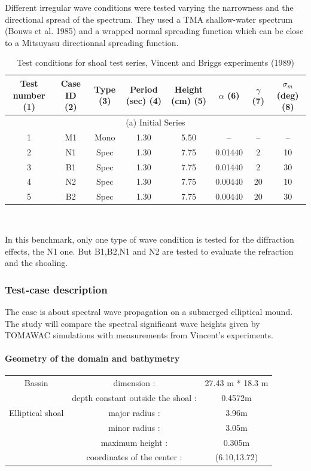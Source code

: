 Different irregular wave conditions were tested varying the narrowness and the directional spread of the spectrum. They used a TMA shallow-water spectrum (Bouws et al. 1985) and a wrapped normal spreading function which can be close to a Mitsuyasu directionnal spreading function.\\
\begin{table}

\begin{tabular}{|c|c|c|c|c|c|c|c|}
\hline
\hline
Test number (1) & Case ID (2) & Type (3) & Period (sec) (4) & Height (cm) (5) & $\alpha$ (6) & $\gamma$ (7) & $\sigma _m$ (deg) (8) \\
\hline
\multicolumn{8}{|c|}{(a) Initial Series}\\
\hline
1 & M1 & Mono & 1.30 & 5.50 & -- & -- & -- \\
2 & N1 & Spec & 1.30 & 7.75 & 0.01440 & 2 & 10\\
3 & B1 & Spec & 1.30 & 7.75 & 0.01440 & 2 & 30\\
4 & N2 & Spec & 1.30 & 7.75 & 0.00440 & 20 & 10\\
5 & B2 & Spec & 1.30 & 7.75 & 0.00440 & 20 & 30\\
\hline
\end{tabular} \\
\caption{Test conditions for shoal test series, Vincent and Briggs experiments  (1989)}

\end{table}

In this benchmark, only one type of wave condition is tested for the diffraction effects, the N1 one. But B1,B2,N1 and N2 are tested to evaluate the refraction and the shoaling.

\subsubsection{Test-case description}
The case is about spectral wave propagation on a submerged elliptical mound. The study will compare the spectral significant wave heights given by TOMAWAC simulations with measurements from Vincent's experiments.
\paragraph{Geometry of the domain and bathymetry}

\begin{tabular}{ccc}
Bassin & dimension :& 27.43 m * 18.3 m\\
 &depth constant outside the shoal :& 0.4572m\\
Elliptical shoal & major radius :& 3.96m\\
 & minor radius :& 3.05m\\
  & maximum height :& 0.305m\\
  & coordinates of the center :& (6.10,13.72)
\end{tabular}


